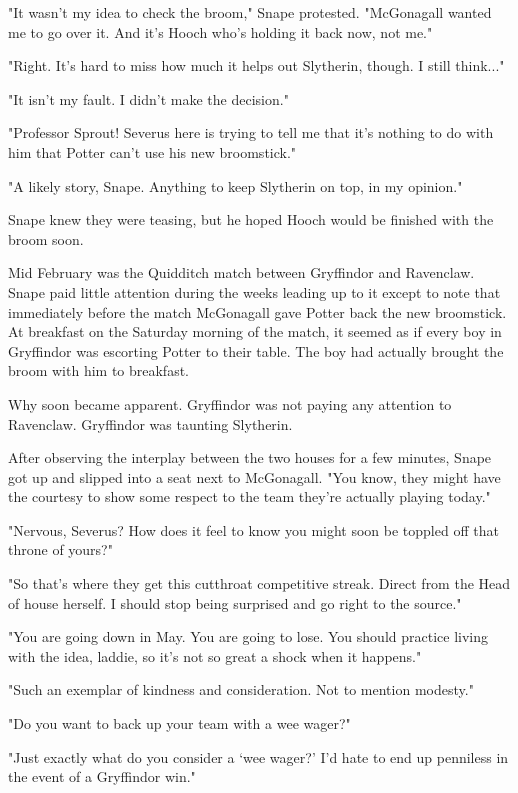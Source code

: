 "It wasn't my idea to check the broom," Snape protested. "McGonagall wanted me to go over it. And it's Hooch who's holding it back now, not me."

"Right. It's hard to miss how much it helps out Slytherin, though. I still think..."

"It isn't my fault. I didn't make the decision."

"Professor Sprout! Severus here is trying to tell me that it's nothing to do with him that Potter can't use his new broomstick."

"A likely story, Snape. Anything to keep Slytherin on top, in my opinion."

Snape knew they were teasing, but he hoped Hooch would be finished with the broom soon.

Mid February was the Quidditch match between Gryffindor and Ravenclaw. Snape paid little attention during the weeks leading up to it except to note that immediately before the match McGonagall gave Potter back the new broomstick. At breakfast on the Saturday morning of the match, it seemed as if every boy in Gryffindor was escorting Potter to their table. The boy had actually brought the broom with him to breakfast.

Why soon became apparent. Gryffindor was not paying any attention to Ravenclaw. Gryffindor was taunting Slytherin.

After observing the interplay between the two houses for a few minutes, Snape got up and slipped into a seat next to McGonagall. "You know, they might have the courtesy to show some respect to the team they're actually playing today."

"Nervous, Severus? How does it feel to know you might soon be toppled off that throne of yours?"

"So that's where they get this cutthroat competitive streak. Direct from the Head of house herself. I should stop being surprised and go right to the source."

"You are going down in May. You are going to lose. You should practice living with the idea, laddie, so it's not so great a shock when it happens."

"Such an exemplar of kindness and consideration. Not to mention modesty."

"Do you want to back up your team with a wee wager?"

"Just exactly what do you consider a `wee wager?' I'd hate to end up penniless in the event of a Gryffindor win."

